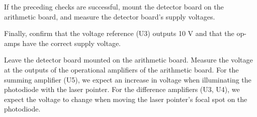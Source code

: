 If the preceding checks are successful, mount the detector board on the arithmetic board, and measure the detector board's supply voltages.

Finally, confirm that the voltage reference (U3) outputs 10 V and that the op-amps have the correct supply voltage.


Leave the detector board mounted on the arithmetic board.
Measure the voltage at the outputs of the operational amplifiers of the arithmetic board.
For the summing amplifier (U5), we expect an increase in voltage when illuminating the photodiode with the laser pointer.
For the difference amplifiers (U3, U4), we expect the voltage to change when moving the laser pointer's focal spot on the photodiode.

